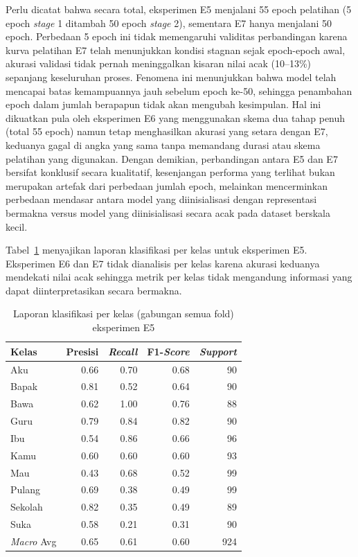 Perlu dicatat bahwa secara total, eksperimen E5 menjalani 55 epoch pelatihan (5 epoch \textit{stage} 1 ditambah 50 epoch \textit{stage} 2), sementara E7 hanya menjalani 50 epoch. Perbedaan 5 epoch ini tidak memengaruhi validitas perbandingan karena kurva pelatihan E7 telah menunjukkan kondisi stagnan sejak epoch-epoch awal, akurasi validasi tidak pernah meninggalkan kisaran nilai acak (10--13\%) sepanjang keseluruhan proses. Fenomena ini menunjukkan bahwa model telah mencapai batas kemampuannya jauh sebelum epoch ke-50, sehingga penambahan epoch dalam jumlah berapapun tidak akan mengubah kesimpulan. Hal ini dikuatkan pula oleh eksperimen E6 yang menggunakan skema dua tahap penuh (total 55 epoch) namun tetap menghasilkan akurasi yang setara dengan E7, keduanya gagal di angka yang sama tanpa memandang durasi atau skema pelatihan yang digunakan. Dengan demikian, perbandingan antara E5 dan E7 bersifat konklusif secara kualitatif, kesenjangan performa yang terlihat bukan merupakan artefak dari perbedaan jumlah epoch, melainkan mencerminkan perbedaan mendasar antara model yang diinisialisasi dengan representasi bermakna versus model yang diinisialisasi secara acak pada dataset berskala kecil.\par

Tabel~\ref{tab:4.s2_perkelas} menyajikan laporan klasifikasi per kelas untuk eksperimen E5. Eksperimen E6 dan E7 tidak dianalisis per kelas karena akurasi keduanya mendekati nilai acak sehingga metrik per kelas tidak mengandung informasi yang dapat diinterpretasikan secara bermakna.\par

\begin{table}[H]
\centering
\caption{Laporan klasifikasi per kelas (gabungan semua fold) eksperimen E5}
\label{tab:4.s2_perkelas}
{\setlength{\tabcolsep}{3pt}
\footnotesize
\begin{tabular}{|l|r|r|r|r|}
\hline
Kelas & \multicolumn{1}{c|}{Presisi} & \multicolumn{1}{c|}{\textit{Recall}} & \multicolumn{1}{c|}{F1-\textit{Score}} & \multicolumn{1}{c|}{\textit{Support}} \\
\hline
Aku     & 0.66 & 0.70 & 0.68 & 90 \\
Bapak   & 0.81 & 0.52 & 0.64 & 90 \\
Bawa    & 0.62 & 1.00 & 0.76 & 88 \\
Guru    & 0.79 & 0.84 & 0.82 & 90 \\
Ibu     & 0.54 & 0.86 & 0.66 & 96 \\
Kamu    & 0.60 & 0.60 & 0.60 & 93 \\
Mau     & 0.43 & 0.68 & 0.52 & 99 \\
Pulang  & 0.69 & 0.38 & 0.49 & 99 \\
Sekolah & 0.82 & 0.35 & 0.49 & 89 \\
Suka    & 0.58 & 0.21 & 0.31 & 90 \\
\hline
\textit{Macro} Avg & 0.65 & 0.61 & 0.60 & 924 \\
\hline
\end{tabular}
}
\end{table}

